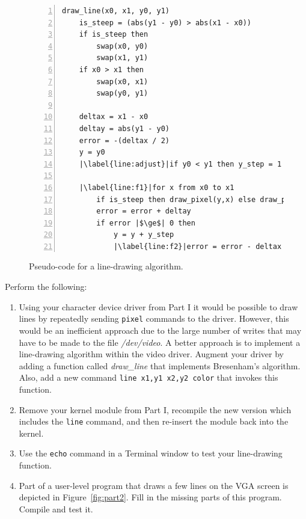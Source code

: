 \documentclass[epsfig,10pt,fullpage]{article}
\begin{document}
\begin{figure}[h]
\begin{center}
\begin{minipage}[t]{12.5 cm}
\begin{lstlisting}[numbers=left,name=bresenham]
draw_line(x0, x1, y0, y1)
	is_steep = (abs(y1 - y0) > abs(x1 - x0))
	if is_steep then
		swap(x0, y0)
		swap(x1, y1)
	if x0 > x1 then
		swap(x0, x1)
		swap(y0, y1)

	deltax = x1 - x0
	deltay = abs(y1 - y0)
	error = -(deltax / 2)
	y = y0
	|\label{line:adjust}|if y0 < y1 then y_step = 1 else y_step = -1

	|\label{line:f1}|for x from x0 to x1
		if is_steep then draw_pixel(y,x) else draw_pixel(x,y)
		error = error + deltay
		if error |$\ge$| 0 then
			y = y + y_step
			|\label{line:f2}|error = error - deltax
\end{lstlisting}
\end{minipage}
\caption{Pseudo-code for a line-drawing algorithm.}
\label{fig:bresenham}
\end{center}
\end{figure}

\newpage
\noindent
Perform the following:

\begin{enumerate}

\item Using your character device driver from Part I it would be possible to draw lines by 
repeatedly sending \texttt{pixel} commands to the driver. However, this would be an inefficient
approach due to the large number of writes that may have to be made to the file {\it /dev/video}.
A better approach is to implement a line-drawing algorithm within the video driver. Augment
your driver by adding a function called {\it draw\_line} that implements Bresenham's algorithm.
Also, add a new command \texttt{line x1,y1 x2,y2 color} that invokes this function.
		  
\item Remove your kernel module from Part I, recompile the new version which includes the
\texttt{line} command, and then re-insert the module back into the kernel.
\item Use the \texttt{echo} command in a Terminal window to test your line-drawing function.
\item Part of a user-level program that draws a few lines on the VGA screen is depicted in
Figure~\ref{fig:part2}. Fill in the missing parts of this program. Compile and test it.
\end{enumerate}
\end{document}
